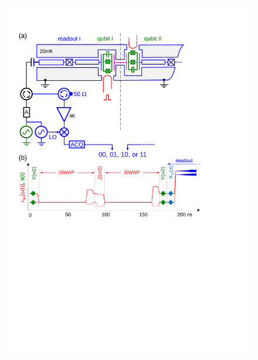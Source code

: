 \begin{figure}
	\centering
		\includegraphics[width=1.\textwidth]{./material/papers/grover/submission1/Fig2}
	\label{fig:Grover2}
	\caption{}
\end{figure}

